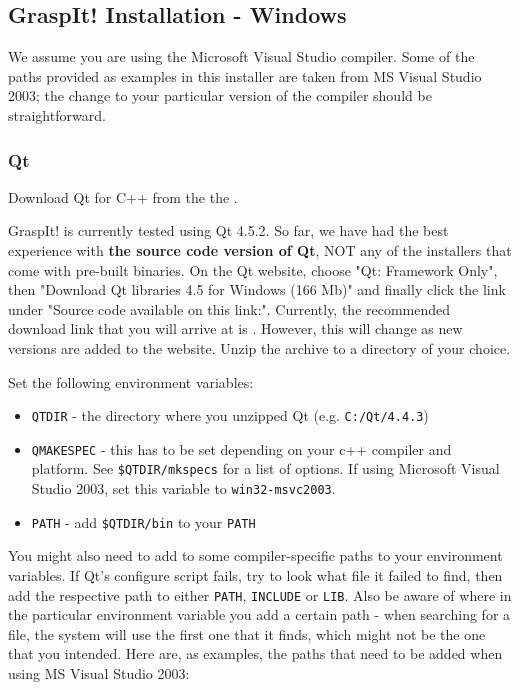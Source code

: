 \subsection{GraspIt! Installation - Windows}

We assume you are using the Microsoft Visual Studio compiler. Some of
the paths provided as examples in this installer are taken from MS
Visual Studio 2003; the change to your particular version of the
compiler should be straightforward.

\subsubsection{Qt}

Download Qt for C++ from the the .

GraspIt! is currently tested using Qt 4.5.2. So far, we have had the
best experience with \textbf{the source code version of Qt}, NOT any
of the installers that come with pre-built binaries. On the Qt
website, choose "Qt: Framework Only", then "Download Qt libraries 4.5
for Windows (166 Mb)" and finally click the link under "Source code
available on this link:". Currently, the recommended download link
that you will arrive at is
. However,
this will change as new versions are added to the website. Unzip the
archive to a directory of your choice.

Set the following environment variables:

\begin{itemize}
\item \texttt{QTDIR} - the directory where you unzipped Qt (e.g. \texttt{C:/Qt/4.4.3})
\item \texttt{QMAKESPEC} - this has to be set depending on your c++
  compiler and platform. See \texttt{\$QTDIR/mkspecs} for a list of
  options. If using Microsoft Visual Studio 2003, set this variable to
  \texttt{win32-msvc2003}.
\item \texttt{PATH} - add \texttt{\$QTDIR/bin} to your \texttt{PATH}
\end{itemize}

You might also need to add to some compiler-specific paths to your
environment variables. If Qt's configure script fails, try to look
what file it failed to find, then add the respective path to either
\texttt{PATH}, \texttt{INCLUDE} or \texttt{LIB}. Also be aware of where in the particular environment variable you add a certain path - when searching for a
file, the system will use the first one that it finds, which might not
be the one that you intended. Here are, as examples, the paths that
need to be added when using MS Visual Studio 2003:

